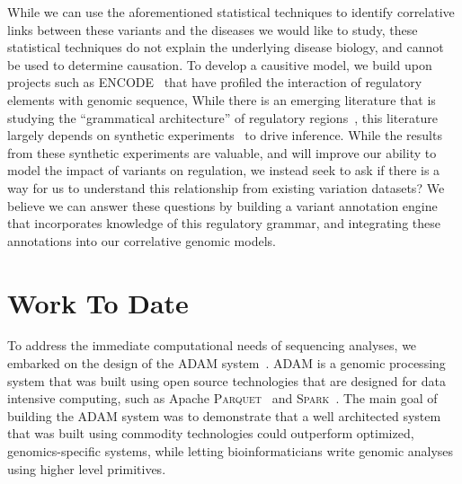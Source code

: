 \documentclass[11pt]{article} %
\begin{document}
While we can use the aforementioned statistical techniques to identify correlative links
between these variants and the diseases we would like to study, these statistical techniques
do not explain the underlying disease biology, and cannot be used to determine causation.
To develop a causitive model, we build upon projects such as ENCODE~\cite{gerstein12} that
have profiled the interaction of regulatory elements with genomic sequence, While there is
an emerging literature that is studying the ``grammatical architecture'' of regulatory
regions~\cite{levo14, weingarten14}, this literature largely depends on synthetic
experiments~\cite{sharon12} to drive inference. While the results from these synthetic
experiments are valuable, and will improve our ability to model the impact of variants
on regulation, we instead seek to ask if there is a way for us to understand this relationship
from existing variation datasets? We believe we can answer these questions by building a variant
annotation engine that incorporates knowledge of this regulatory grammar, and integrating
these annotations into our correlative genomic models.

\section{Work To Date}

To address the immediate computational needs of sequencing analyses, we embarked on the design of
the \textsc{ADAM} system~\cite{massie13, nothaft15}. \textsc{ADAM} is a genomic processing system
that was built using open source technologies that are designed for data intensive computing, such
as Apache \textsc{Parquet}~\cite{parquet} and \textsc{Spark}~\cite{zaharia12, zaharia10}. The main
goal of building the \textsc{ADAM} system was to demonstrate that a well architected system that
was built using commodity technologies could outperform optimized, genomics-specific systems,
while letting bioinformaticians write genomic analyses using higher level primitives.
\end{document}
